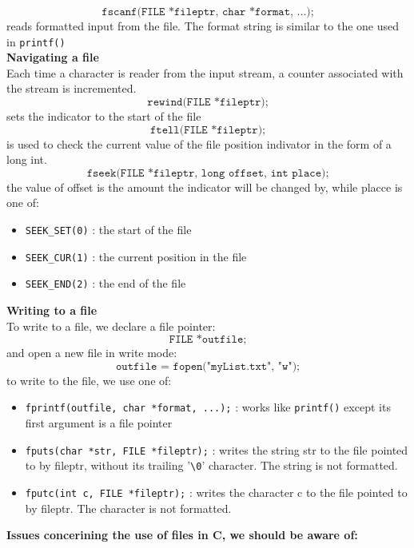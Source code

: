 \documentclass[a4paper, 10pt]{article}
\begin{document}
$$\texttt{fscanf(FILE *fileptr, char *format, ...);}$$
reads formatted input from the file. The format string is similar to the
one used in \texttt{printf()} \\[2ex]
\textbf{Navigating a file} \\
Each time a character is reader from the input stream, a counter associated with the stream is incremented.
$$\texttt{rewind(FILE *fileptr);}$$
sets the indicator to the start of the file
$$\texttt{ftell(FILE *fileptr);}$$
is used to check the current value of the file position indivator in the form of a long int.
$$\texttt{fseek(FILE *fileptr, long offset, int place);}$$
the value of offset is the amount the indicator will be changed by, while placce is one of:
\begin{itemize}
    \item \texttt{SEEK\_SET(0)} : the start of the file
    \item \texttt{SEEK\_CUR(1)} : the current position in the file
    \item \texttt{SEEK\_END(2)} : the end of the file
\end{itemize}
\textbf{Writing to a file} \\
To write to a file, we declare a file pointer:
$$\texttt{FILE *outfile;}$$
and open a new file in write mode:
$$\texttt{outfile = fopen("myList.txt", "w");}$$
to write to the file, we use one of:
\begin{itemize}
    \item \texttt{fprintf(outfile, char *format, ...);} : works like \texttt{printf()} except its first argument is a file pointer
    \item \texttt{fputs(char *str, FILE *fileptr);} : writes the string str to the file pointed to by fileptr, without its trailing '\texttt{\textbackslash 0}' character. The string is not formatted.
    \item \texttt{fputc(int c, FILE *fileptr);} : writes the character c to the file pointed to by fileptr. The character is not formatted.
\end{itemize}
\textbf{Issues concerining the use of files in C, we should be aware of:}
\end{document}
